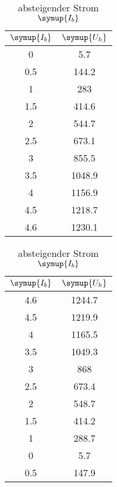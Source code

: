 \vspace{-2cm}

   \begin{table}[!ht]
    \caption*{\textbf{Magnetfeldstärke}}
    \begin{minipage}{0.49\textwidth}
          \centering  
          \caption{ansteigender Strom $\symup{I_b}$}
          \label{tab:bconst}
          \begin{tabular}{c c}
            \toprule
            $\symup{I_b}$ & $\symup{U_h}$ \\
            \midrule
                0   &  5.7 \\
                0.5 & 144.2 \\
                1   & 283 \\
                1.5 & 414.6 \\
                2   & 544.7 \\
                2.5 & 673.1 \\
                3   & 855.5 \\
                3.5 & 1048.9 \\
                4   & 1156.9 \\
                4.5 & 1218.7 \\
                4.6 & 1230.1 \\
            \bottomrule
        \end{tabular}
    \end{minipage}
    \hfill
    \begin{minipage}{0.49\textwidth}
        \centering
          \caption{absteigender Strom $\symup{I_b}$}
          \label{tab:bconst-}
           \begin{tabular}{c c}
            \toprule
            $\symup{I_b}$ & $\symup{U_h}$ \\
            \midrule
            4.6 & 1244.7  \\
            4.5 & 1219.9 \\
            4   & 1165.5 \\
            3.5 & 1049.3 \\
            3   & 868 \\
            2.5 & 673.4 \\
            2   & 548.7 \\
            1.5 & 414.2 \\
            1   & 288.7 \\
            0   & 5.7 \\
            0.5 & 147.9 \\
            \bottomrule
       \end{tabular}
     \end{minipage}
  \end{table}